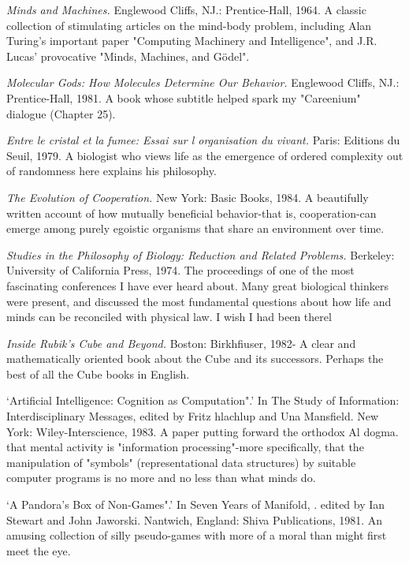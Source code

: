  {\sl Minds and Machines.} Englewood Cliffs, NJ.: Prentice-Hall, 1964. A classic collection of stimulating articles on the mind-body problem, including Alan Turing's important paper "Computing Machinery and Intelligence", and J.R. Lucas' provocative "Minds, Machines, and Gödel".

 {\sl Molecular Gods: How Molecules Determine Our Behavior.} Englewood Cliffs, NJ.: Prentice-Hall, 1981. A book whose subtitle helped spark my "Careenium" dialogue (Chapter 25).

 {\sl Entre le cristal et la fumee: Essai sur l organisation du vivant.} Paris: Editions du Seuil, 1979. A biologist who views life as the emergence of ordered complexity out of randomness here explains his philosophy.

 {\sl The Evolution of Cooperation.} New York: Basic Books, 1984. A beautifully written account of how mutually beneficial behavior-that is, cooperation-can emerge among purely egoistic organisms that share an environment over time.

 {\sl Studies in the Philosophy of Biology: Reduction and Related Problems.} Berkeley: University of California Press, 1974. The proceedings of one of the most fascinating conferences I have ever heard about. Many great biological thinkers were present, and discussed the most fundamental questions about how life and minds can be reconciled with physical law. I wish I had been therel

 {\sl Inside Rubik's Cube and Beyond.} Boston: Birkhfiuser, 1982- A clear and mathematically oriented book about the Cube and its successors. Perhaps the best of all the Cube books in English.

 `Artificial Intelligence: Cognition as Computation".' In The Study of Information: Interdisciplinary Messages, edited by Fritz hlachlup and Una Mansfield. New York: Wiley-Interscience, 1983. A paper putting forward the orthodox Al dogma. that mental activity is "information processing"-more specifically, that the manipulation of "symbols" (representational data structures) by suitable computer programs is no more and no less than what minds do.

 `A Pandora's Box of Non-Games".' In Seven Years of Manifold, . edited by Ian Stewart and John Jaworski. Nantwich, England: Shiva Publications, 1981. An amusing collection of silly pseudo-games with more of a moral than might first meet the eye.

